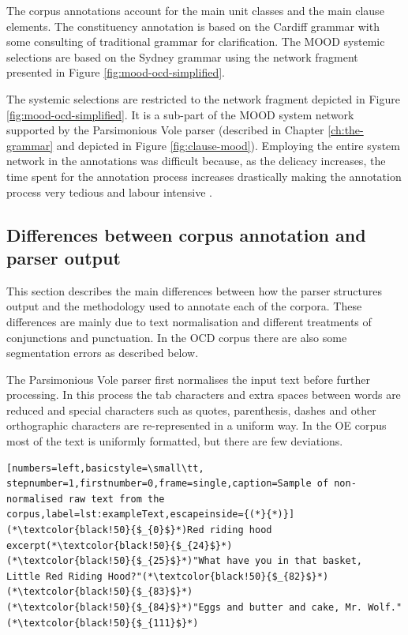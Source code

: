     The corpus annotations account for the main unit classes and the main clause elements. The constituency annotation is based on the Cardiff grammar \citep{Fawcett2008} with some consulting of traditional grammar \citep{Quirk1985} for clarification. The MOOD systemic selections are based on the Sydney grammar \citep{Halliday2013} using the network fragment presented in Figure \ref{fig:mood-ocd-simplified}.
    
    The systemic selections are restricted to the network fragment depicted in Figure \ref{fig:mood-ocd-simplified}. It is a sub-part of the MOOD system network supported by the Parsimonious Vole parser (described in Chapter \ref{ch:the-grammar} and depicted in Figure \ref{fig:clause-mood}). Employing the entire system network in the annotations was difficult because, as the delicacy increases, the time spent for the annotation process increases drastically making the annotation process very tedious and labour intensive \citep{mcenery2006corpus}.
    
\subsection{Differences between corpus annotation and parser output}
\label{sec:differences}

    This section describes the main differences between how the parser structures output and the methodology used to annotate each of the corpora. These differences are mainly due to text normalisation and different treatments of conjunctions and punctuation. In the OCD corpus there are also some segmentation errors as described below.
    
    The Parsimonious Vole parser first normalises the input text before further processing. In this process the tab characters and extra spaces between words are reduced and special characters such as quotes, parenthesis, dashes and other orthographic characters are re-represented in a uniform way. In the OE corpus most of the text is uniformly formatted, but there are few deviations. 
    
\begin{minipage}{\linewidth}
\begin{lstlisting}[numbers=left,basicstyle=\small\tt, stepnumber=1,firstnumber=0,frame=single,caption=Sample of non-normalised raw text from the corpus,label=lst:exampleText,escapeinside={(*}{*)}]
(*\textcolor{black!50}{$_{0}$}*)Red riding hood excerpt(*\textcolor{black!50}{$_{24}$}*)
(*\textcolor{black!50}{$_{25}$}*)"What have you in that basket,   Little Red Riding Hood?"(*\textcolor{black!50}{$_{82}$}*)
(*\textcolor{black!50}{$_{83}$}*)
(*\textcolor{black!50}{$_{84}$}*)"Eggs and butter and cake, Mr. Wolf."(*\textcolor{black!50}{$_{111}$}*)
\end{lstlisting}
\end{minipage}

